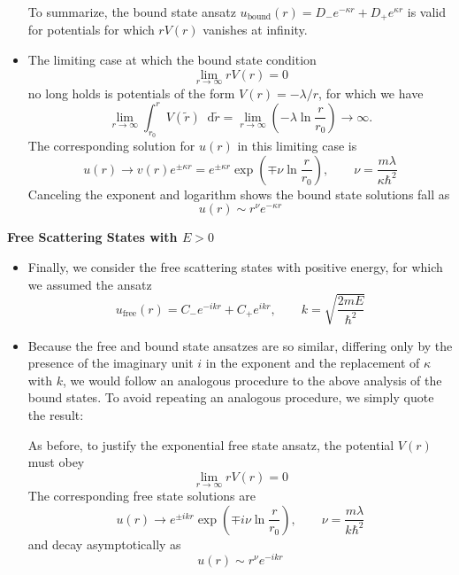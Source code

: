 \documentclass[11pt, a4paper]{article}
\newcommand{\diff}{\mathop{}\!\mathrm{d}} %
\renewcommand{\t}[1]{\tilde{#1}}
\begin{document}
\begin{itemize}
	
	To summarize, the bound state ansatz $ u_{\text{bound}}(r) = D_{-}e^{-\kappa r} + D_{+}e^{\kappa r} $ is valid for potentials for which $ r V(r) $ vanishes at infinity.
	
	\item The limiting case at which the bound state condition 
	\begin{equation*}
		\lim_{r \to \infty}rV(r) = 0
	\end{equation*}
	no long holds is potentials of the form $ V(r) = - \lambda/r $, for which we have
	\begin{equation*}
		\lim_{r \to \infty} \int_{r_{0}}^{r}V(\t{r})\diff \t{r} = \lim_{r \to \infty} \left(- \lambda \ln \frac{r}{r_{0}}\right) \to \infty.
	\end{equation*}
	The corresponding solution for $ u(r) $ in this limiting case is
	\begin{equation*}
		u(r) \to v(r)e^{\pm \kappa r} = e^{\pm \kappa r} \exp(\mp \nu \ln  \frac{r}{r_{0}}), \qquad \nu = \frac{m \lambda}{\kappa \hbar^{2}}
	\end{equation*}
	Canceling the exponent and logarithm shows the bound state solutions fall as
	\begin{equation*}
		u(r) \sim r^{\nu} e^{- \kappa r}
	\end{equation*}
	
\end{itemize}

\textbf{Free Scattering States with $ E > 0 $}
\begin{itemize}
	\item Finally, we consider the free scattering states with positive energy, for which we assumed the ansatz
	\begin{equation*}
		u_{\text{free}}(r) = C_{-}e^{-i k r} + C_{+}e^{i k r}, \qquad k = \sqrt{\frac{2mE}{\hbar^{2}}}
	\end{equation*}
	
	\item Because the free and bound state ansatzes are so similar, differing only by the presence of the imaginary unit $ i $ in the exponent and the replacement of $ \kappa $ with $ k $, we would follow an analogous procedure to the above analysis of the bound states. To avoid repeating an analogous procedure, we simply quote the result: 
	
	As before, to justify the exponential free state ansatz, the potential $ V(r) $ must obey
	\begin{equation*}
		\lim_{r \to \infty} r V(r) = 0
	\end{equation*}
	The corresponding free state solutions are
	\begin{equation*}
		u(r) \to e^{\pm i k r} \exp(\mp i \nu \ln  \frac{r}{r_{0}}), \qquad \nu = \frac{m \lambda}{k \hbar^{2}}
	\end{equation*}
	and decay asymptotically as
	\begin{equation*}
		u(r) \sim r^{\nu} e^{- ik r}
	\end{equation*}
\end{itemize}
\end{document}
